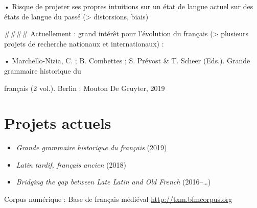 \documentclass[
  letterpaper,
]{scrbook}
\begin{document}
• Risque de projeter ses propres intuitions sur un état de langue actuel
sur des états de langue du passé (\textgreater{} distorsions, biais)

\#\#\#\# Actuellement : grand intérêt pour l'évolution du français
(\textgreater{} plusieurs projets de recherche nationaux et
internationaux) :

• Marchello-Nizia, C. ; B. Combettes ; S. Prévost \& T. Scheer (Eds.).
Grande grammaire historique du

français (2 vol.). Berlin : Mouton De Gruyter, 2019

\hypertarget{projets-actuels}{%
\section{Projets actuels}\label{projets-actuels}}

\begin{itemize}
\item
  \emph{Grande grammaire historique du français} (2019)
\item
  \emph{Latin tardif, français ancien} (2018)
\item
  \emph{Bridging the gap between Late Latin and Old French}
  (2016--\ldots)
\end{itemize}

Corpus numérique : Base de français médiéval
\href{https://txm.bfmcorpus.org}{http://txm.bfmcorpus.org}


\backmatter
\end{document}
